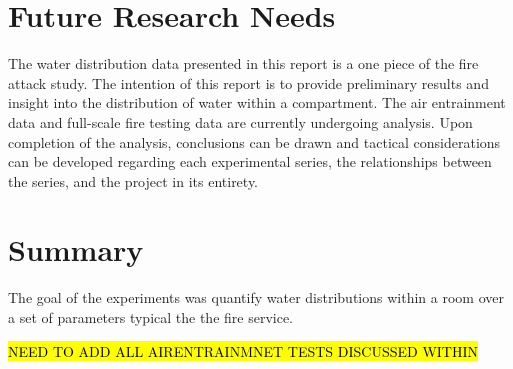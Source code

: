 \documentclass[12pt,oneside]{book}
\begin{document}
\clearpage

\chapter{Future Research Needs}

The water distribution data presented in this report is a one piece of the fire attack study. The intention of this report is to provide preliminary results and insight into the distribution of water within a compartment. The air entrainment data and full-scale fire testing data are currently undergoing analysis. Upon completion of the analysis, conclusions can be drawn and tactical considerations can be developed regarding each experimental series, the relationships between the series, and the project in its entirety.  

\chapter{Summary}

The goal of the experiments was quantify water distributions within a room over a set of parameters typical the the fire service. 




\clearpage

\appendix

\hl{NEED TO ADD ALL AIRENTRAINMNET TESTS DISCUSSED WITHIN}


\end{document}
